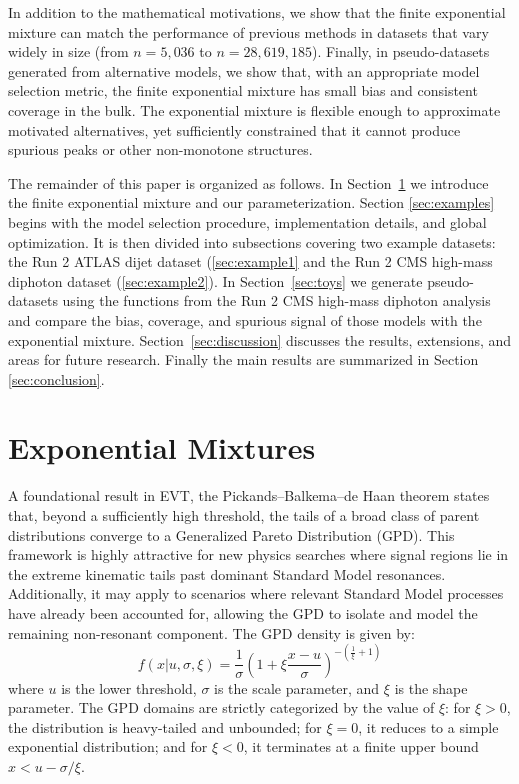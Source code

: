 \documentclass[a4paper,11pt]{article}
\begin{document}
In addition to the mathematical motivations, we show that the finite exponential mixture can 
match the performance of previous methods in datasets that vary widely in size (from $n=5,036$ 
to $n=28,619,185$). Finally, in pseudo-datasets generated from alternative models, we show that, with an appropriate model 
selection metric, the finite exponential mixture has small bias and consistent coverage in the 
bulk. The exponential mixture is flexible enough to approximate motivated alternatives, yet sufficiently constrained that it cannot produce spurious peaks or other non-monotone structures.

The remainder of this paper is organized as follows. In Section~\ref{sec:emm} we introduce the 
finite exponential mixture and our parameterization. Section \ref{sec:examples} begins with the model selection procedure, implementation details, and global optimization. It is then divided into subsections covering two example datasets: the Run 2 ATLAS dijet dataset (\ref{sec:example1} and the Run 2 CMS high-mass diphoton dataset (\ref{sec:example2}). In 
Section~\ref{sec:toys} we generate pseudo-datasets using the functions from the Run 2 CMS high-mass diphoton analysis and compare the bias, coverage, and spurious signal of those models 
with the exponential mixture. Section~\ref{sec:discussion} discusses the results, extensions, and areas for future research. Finally the main results are summarized in Section \ref{sec:conclusion}.

\section{Exponential Mixtures}
\label{sec:emm}

A foundational result in EVT, the Pickands--Balkema--de Haan theorem
\cite{Picklands_1975, Balkema_Haan_1974} states that, beyond a sufficiently high threshold, the tails of a broad class of parent distributions converge to a Generalized Pareto Distribution 
(GPD). This framework is highly attractive for new physics searches where signal regions lie in the extreme kinematic tails past dominant Standard Model resonances. Additionally, it may apply to scenarios where relevant Standard Model processes have already been accounted for, allowing the GPD to isolate and model the remaining non-resonant component. The GPD density is given by:
\begin{equation}
f(x | u, \sigma, \xi) = \frac{1}{\sigma} \left( 1 + \xi \frac{x - u}{\sigma} 
\right)^{-\left( \frac{1}{\xi} + 1 \right)}
\end{equation}
where $u$ is the lower threshold, $\sigma$ is the scale parameter, and $\xi$ is the shape 
parameter. The GPD domains are strictly categorized by the value of $\xi$: for $\xi>0$, the 
distribution is heavy-tailed and unbounded; for $\xi=0$, it reduces to a simple exponential 
distribution; and for $\xi<0$, it terminates at a finite upper bound $x<u-\sigma/\xi$.
\end{document}
